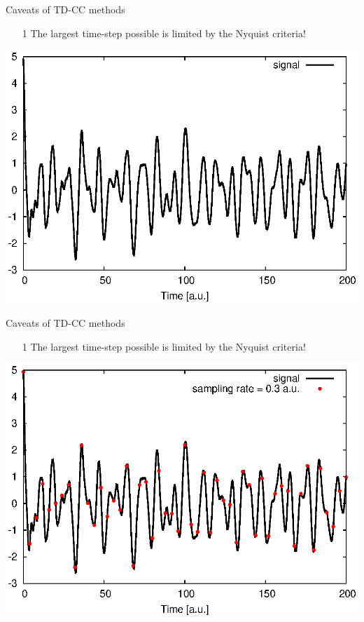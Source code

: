 \documentclass{beamer}
\begin{document}
\begin{frame}{Caveats of TD-CC methods}
\begin{enumerate}
\item[1]{The largest time-step possible is limited by the Nyquist criteria!}
\end{enumerate}
\begin{center}
  \includegraphics[scale=0.8]{figures/nyquist1.eps}
\end{center}
\end{frame}

\begin{frame}{Caveats of TD-CC methods}
\begin{enumerate}
\item[1]{The largest time-step possible is limited by the Nyquist criteria!}
\end{enumerate}
\begin{center}
  \includegraphics[scale=0.8]{figures/nyquist2.eps}
\end{center}
\end{frame}
\end{document}

